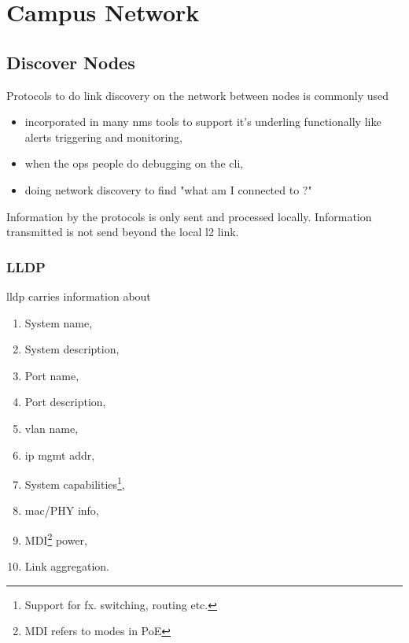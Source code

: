 \chapter{Campus Network}

\section{Discover Nodes}

Protocols to do link discovery on the network between nodes is commonly used
\begin{itemize}
    \item incorporated in many \gls{nms} tools to support it's underling functionally like alerts triggering and monitoring,
    \item when the ops people do debugging on the \gls{cli},
    \item doing network discovery to find "what am I connected to ?"
\end{itemize}

Information by the protocols is only sent and processed locally. Information transmitted is not send beyond the local \gls{l2} link.

\newpage

\subsection{LLDP}


\gls{lldp} carries information about
\begin{enumerate}
    \item System name,
    \item System description,
    \item Port name,
    \item Port description,
    \item \gls{vlan} name,
    \item \gls{ip} mgmt addr,
    \item System capabilities\footnote{Support for fx. switching, routing etc.},
    \item \gls{mac}/PHY info,
    \item MDI\footnote{MDI refers to modes in PoE} power,
    \item Link aggregation.
\end{enumerate}

